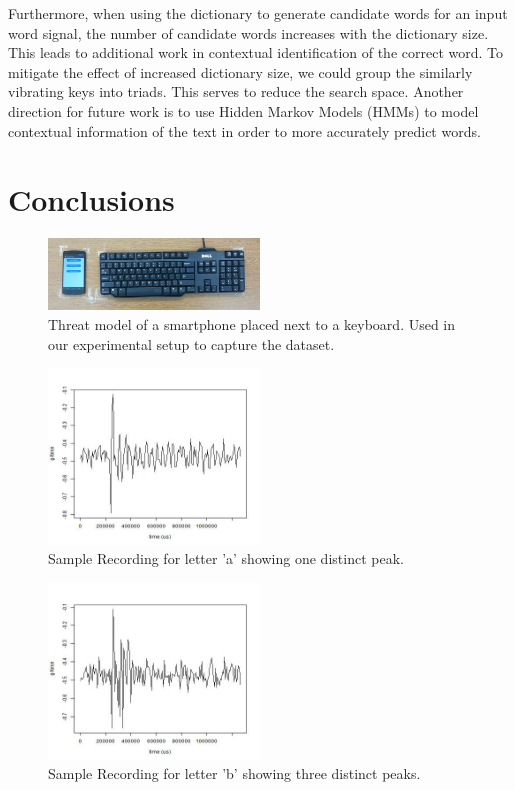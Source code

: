 \documentclass[11pt,conference]{IEEEtran}
\begin{document}
Furthermore, when using the dictionary to generate
candidate words for an input word signal, the number of candidate words increases with the dictionary
size. This leads to additional work in contextual identification of the correct word. To mitigate the
effect of increased dictionary size, we could group the similarly vibrating keys into triads. This serves
to reduce the search space. 
Another direction for future work is to use Hidden Markov Models (HMMs) to model contextual information of the text in order to more accurately predict words.


\section{Conclusions}
\label{sec:conclusion}


\pagebreak

\begin{figure}
\centering
\includegraphics[width=0.5\textwidth]{img/setup}
\caption{Threat model of a smartphone placed next to a keyboard. Used in our experimental setup to capture the dataset.
}
\label{fig:setup}
\end{figure}

\begin{figure}
\centering
\includegraphics[width=0.5\textwidth]{img/a_162}
\caption{Sample Recording for letter 'a' showing one distinct peak.}
\label{fig:signal-a}
\end{figure}

\begin{figure}
\centering
\includegraphics[width=0.5\textwidth]{img/b_147}
\caption{Sample Recording for letter 'b' showing three distinct peaks.}
\label{fig:signal-b}
\end{figure}
\end{document}
